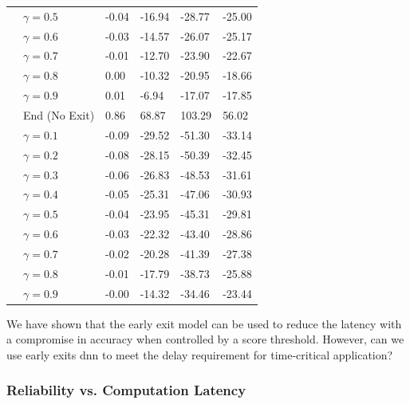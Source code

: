 \begin{minipage}[t]{\linewidth}
\begin{small}
\begin{longtabu}{>{\bfseries}X|X|X[r]|X[r]|X[r]|X[r]}
			&$ \gamma = 0.5 $ 	& -0.04 & -16.94 & -28.77 & -25.00  \tabularnewline
			&$ \gamma = 0.6 $ 	& -0.03 & -14.57 & -26.07 & -25.17  \tabularnewline 
			&$ \gamma = 0.7 $ 	& -0.01 & -12.70 & -23.90 & -22.67  \tabularnewline 
			&$ \gamma = 0.8 $ 	&  0.00 & -10.32 & -20.95 & -18.66  \tabularnewline 
			&$ \gamma = 0.9 $ 	&  0.01 &  -6.94 & -17.07 & -17.85  \tabularnewline 
			\hline
			 & End (No Exit) & 0.86 & 68.87 & 103.29 & 56.02 \tabularnewline {}
			&$ \gamma = 0.1 $ 	& -0.09 & -29.52 & -51.30 & -33.14 \tabularnewline
			&$ \gamma = 0.2 $ 	& -0.08 & -28.15 & -50.39 & -32.45 \tabularnewline 
			&$ \gamma = 0.3 $ 	& -0.06 & -26.83 & -48.53 & -31.61 \tabularnewline
			&$ \gamma = 0.4 $ 	& -0.05 & -25.31 & -47.06 & -30.93 \tabularnewline 
			&$ \gamma = 0.5 $ 	& -0.04 & -23.95 & -45.31 & -29.81 \tabularnewline
			&$ \gamma = 0.6 $ 	& -0.03 & -22.32 & -43.40 & -28.86 \tabularnewline 
			&$ \gamma = 0.7 $ 	& -0.02 & -20.28 & -41.39 & -27.38 \tabularnewline 
			&$ \gamma = 0.8 $ 	& -0.01 & -17.79 & -38.73 & -25.88 \tabularnewline 
			&$ \gamma = 0.9 $ 	& -0.00 & -14.32 & -34.46 & -23.44 \tabularnewline 
			\bottomrule
		\end{longtabu}
	\end{small}
\end{minipage}

We have shown that the early exit model can be used to reduce the latency with a compromise in accuracy when controlled by a score threshold. However, can we use early exits \gls{dnn} to meet the delay requirement for time-critical application? 

\newpage\subsubsection{Reliability vs. Computation Latency}


